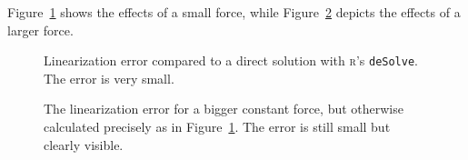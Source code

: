 \documentclass[utf8,english,DIV=12]{scrartcl}
\begin{document}
Figure~\ref{fig:SmallForceRdeSolve} shows the effects of a small force, while Figure~\ref{fig:WithForceRdeSolve} depicts the effects of a larger force.

\begin{figure}\sffamily\firalining
  \centering
  
  \caption{Linearization error compared to a direct solution with
    \textsc{r}'s \texttt{deSolve}. The error is very small.\label{fig:SmallForceRdeSolve} }
\end{figure}


\begin{figure}\sffamily\firalining
  \centering
  
  \caption{The linearization error for a bigger constant force, but
    otherwise calculated precisely as in
    Figure~\ref{fig:SmallForceRdeSolve}. The error is still small but clearly visible.  \label{fig:WithForceRdeSolve} }
\end{figure}
\end{document}
